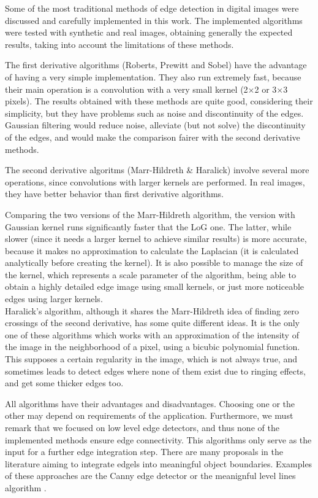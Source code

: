 \documentclass{ipol}
\numberwithin{equation}{section}
\numberwithin{table}{section}
\begin{document}
Some of the most traditional methods of edge detection in digital images were discussed and carefully implemented in this work. The implemented algorithms were tested with synthetic and real images, obtaining generally the expected results, taking into account the limitations of these methods. 

The first derivative algorithms (Roberts, Prewitt and Sobel) have the advantage of having a very simple implementation. They also run extremely fast, because their main operation is a convolution with a very small kernel (2$\times$2 or 3$\times$3 pixels). The results obtained with these methods are quite good, considering their simplicity, but they have problems such as noise and discontinuity of the edges. Gaussian filtering would reduce noise, alleviate (but not solve) the discontinuity of the edges, and would make the comparison fairer with the second derivative methods. 

The second derivative algoritms (Marr-Hildreth \& Haralick) involve several more operations, since convolutions with larger kernels are performed. In real images, they have better behavior than first derivative algorithms. 

Comparing the two versions of the Marr-Hildreth algorithm, the version with Gaussian kernel runs significantly faster that the LoG one. The latter, while slower (since it needs a larger kernel to achieve similar results) is more accurate, because it makes no approximation to calculate the Laplacian (it is calculated analytically before creating the kernel). It is also possible to manage the size of the kernel, which represents a scale parameter of the algorithm, being able to obtain a highly detailed edge image using small kernels, or just more noticeable edges using larger kernels. \\

Haralick's algorithm, although it shares the Marr-Hildreth idea of finding zero crossings of the second derivative, has some quite different ideas. It is the only one of these algorithms which works with an approximation of the intensity of the image in the neighborhood of a pixel, using a bicubic polynomial function. This supposes a certain regularity in the image, which is not always true, and sometimes leads to detect edges where none of them exist due to ringing effects, and get some thicker edges too. 

All algorithms have their advantages and disadvantages. Choosing one or the other may depend on requirements of the application. Furthermore, we must remark that we focused on low level edge detectors, and thus none of the implemented methods ensure edge connectivity. This algorithms only serve as the input for a further edge integration step. There are many proposals in the literature aiming to integrate edgels into meaningful object boundaries. Examples of these approaches are the Canny edge detector \cite{Canny1986} or the meanignful level lines algorithm \cite{segm:cao:03:extracting_meaningful}.
\end{document}
